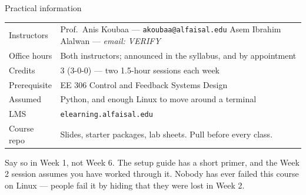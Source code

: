 \documentclass[aspectratio=169]{beamer}
\begin{document}
\begin{frame}{Practical information}
  \small
  \begin{table}
    \begin{tabular}{@{}p{3.0cm}p{8.4cm}@{}}
      \toprule
      Instructors     & Prof.\ Anis Koubaa --- \texttt{akoubaa@alfaisal.edu} \newline
                        Asem Ibrahim Alalwan --- \emph{email: VERIFY} \\
      Office hours    & Both instructors; announced in the syllabus, and by appointment \\
      Credits         & 3 (3-0-0) --- two 1.5-hour sessions each week \\
      Prerequisite    & EE 306 Control and Feedback Systems Design \\
      Assumed         & Python, and enough Linux to move around a terminal \\
      LMS             & \texttt{elearning.alfaisal.edu} \\
      Course repo     & Slides, starter packages, lab sheets. Pull before every class. \\
      \bottomrule
    \end{tabular}
  \end{table}

  \vspace{0.3em}
  \begin{underhood}
    \footnotesize
    Say so in Week 1, not Week 6. The setup guide has a short primer, and the Week 2 session
    assumes you have worked through it. Nobody has ever failed this course on Linux --- people
    fail it by hiding that they were lost in Week 2.
  \end{underhood}
\end{frame}
\end{document}
